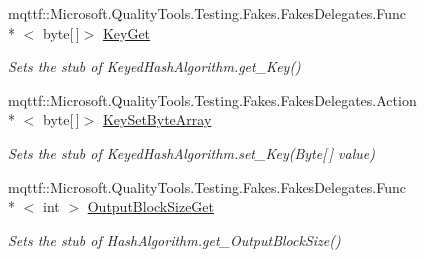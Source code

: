 \begin{DoxyCompactItemize}
mqttf\-::\-Microsoft.\-Quality\-Tools.\-Testing.\-Fakes.\-Fakes\-Delegates.\-Func\\*
$<$ byte\mbox{[}$\,$\mbox{]}$>$ \hyperlink{class_system_1_1_security_1_1_cryptography_1_1_fakes_1_1_stub_m_a_c_triple_d_e_s_a715b2f05b9dcc83c4c9fc6bd22e32001}{Key\-Get}
\begin{DoxyCompactList}\small\item\em Sets the stub of Keyed\-Hash\-Algorithm.\-get\-\_\-\-Key()\end{DoxyCompactList}\item 
mqttf\-::\-Microsoft.\-Quality\-Tools.\-Testing.\-Fakes.\-Fakes\-Delegates.\-Action\\*
$<$ byte\mbox{[}$\,$\mbox{]}$>$ \hyperlink{class_system_1_1_security_1_1_cryptography_1_1_fakes_1_1_stub_m_a_c_triple_d_e_s_a2ccaeab035d106fbc786b1c4d22ed300}{Key\-Set\-Byte\-Array}
\begin{DoxyCompactList}\small\item\em Sets the stub of Keyed\-Hash\-Algorithm.\-set\-\_\-\-Key(\-Byte\mbox{[}$\,$\mbox{]} value)\end{DoxyCompactList}\item 
mqttf\-::\-Microsoft.\-Quality\-Tools.\-Testing.\-Fakes.\-Fakes\-Delegates.\-Func\\*
$<$ int $>$ \hyperlink{class_system_1_1_security_1_1_cryptography_1_1_fakes_1_1_stub_m_a_c_triple_d_e_s_a97a30c8872891f4e583ab445d6ac2671}{Output\-Block\-Size\-Get}
\begin{DoxyCompactList}\small\item\em Sets the stub of Hash\-Algorithm.\-get\-\_\-\-Output\-Block\-Size()\end{DoxyCompactList}\end{DoxyCompactItemize}
